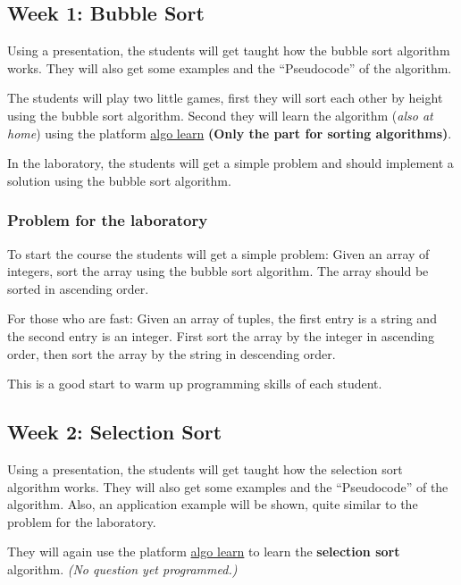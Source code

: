 \documentclass[10pt, oneside]{article}
\theoremstyle{remark}
\begin{document}
\subsection{Week 1: Bubble Sort}
Using a presentation, the students will get taught how the bubble sort algorithm works. They will also get some examples and the \enquote{Pseudocode} of the algorithm. 

The students will play two little games, first they will sort each other by height using the bubble sort algorithm. Second they will learn the algorithm (\textit{also at home}) using the platform \href{https://tcs.uni-frankfurt.de/algo-learn-testing/refs_heads_feat-bubbleSort/en
}{algo learn} \textbf{(Only the part for sorting algorithms)}.

In the laboratory, the students will get a simple problem and should implement a solution using the bubble sort algorithm.

\subsubsection*{Problem for the laboratory}
\begin{tcolorbox}
  To start the course the students will get a simple problem: Given an array of integers, sort the array using the bubble sort algorithm. The array should be sorted in ascending order. 

  For those who are fast: Given an array of tuples, the first entry is a string and the second entry is an integer. First sort the array by the integer in ascending order, then sort the array by the string in descending order.
\end{tcolorbox}
This is a good start to warm up programming skills of each student.

\subsection{Week 2: Selection Sort}
Using a presentation, the students will get taught how the selection sort algorithm works. They will also get some examples and the \enquote{Pseudocode} of the algorithm. Also, an application example will be shown, quite similar to the problem for the laboratory. 

They will again use the platform \href{https://tcs.uni-frankfurt.de/algo-learn-testing/refs_heads_feat-bubbleSort/en
}{algo learn} to learn the \textbf{selection sort} algorithm. \textit{(No question yet programmed.)}
\end{document}
